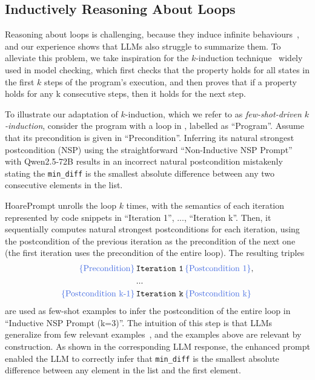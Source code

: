 \documentclass[sigconf]{acmart}
\makeatletter
\newcommand{\projName}{HoarePrompt\xspace}
\def\mathcolor#1#{\@mathcolor{#1}}
\def\@mathcolor#1#2#3{%
  \protect\leavevmode
  \begingroup
    \color#1{#2}#3%
  \endgroup
}
\makeatother
\begin{document}
\vspace{-3mm}
\subsection{Inductively Reasoning About Loops}
\label{sec:motivating_example_induction}

Reasoning about loops is challenging, because they induce infinite behaviours~\cite{si2018learning}, and our experience shows that LLMs also struggle to summarize them. To alleviate this problem, we take inspiration for the $k$-induction technique~\cite{donaldson2011software} widely used in model checking, which first checks that the property holds for all states in the first $k$ steps of the program's execution, and then proves that if a property holds for any k consecutive steps, then it holds for the next step.

To illustrate our adaptation of $k$-induction, which we refer to as \emph{few-shot-driven $k$-induction}, consider the program with a loop in , labelled as ``Program''. Assume that its precondition is given in ``Precondition''. Inferring its natural strongest postcondition (NSP) using the straightforward ``Non-Inductive NSP Prompt'' with Qwen2.5-72B results in an incorrect natural postcondition mistakenly stating the \texttt{min\_diff} is the smallest absolute difference between any two consecutive elements in the list.

\projName unrolls the loop $k$ times, with the semantics of each iteration represented by code snippets in ``Iteration 1'', ..., ``Iteration k''. Then, it sequentially computes natural strongest postconditions for each iteration, using the postcondition of the previous iteration as the precondition of the next one (the first iteration uses the precondition of the entire loop). The resulting triples
\begin{align*}
  \mathcolor{softblue}{\{ \text{Precondition} \}} \,&\mathtt{Iteration\ 1}\, \mathcolor{softblue}{\{ \text{Postcondition 1} \}},\\
  &...\\
  \mathcolor{softblue}{\{ \text{Postcondition k-1} \}} \,&\mathtt{Iteration\ k}\, \mathcolor{softblue}{\{ \text{Postcondition k} \}}
\end{align*}
are used as few-shot examples to infer the postcondition of the entire loop in ``Inductive NSP Prompt (k=3)''. The intuition of this step is that LLMs generalize from few relevant examples~\cite{brown2020language}, and the examples above are relevant by construction. As shown in the corresponding LLM response, the enhanced prompt enabled the LLM to correctly infer that \texttt{min\_diff} is the smallest absolute difference between any  element in the list and the first element.
\end{document}
